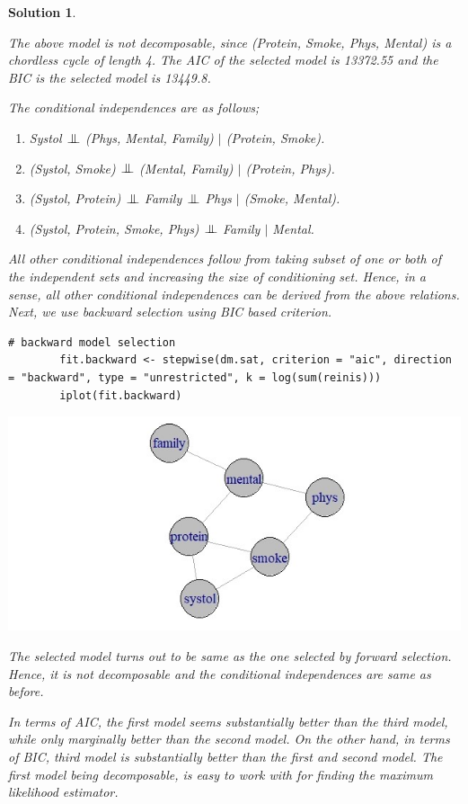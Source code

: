 \documentclass[12pt]{article}
\theoremstyle{problemstyle}
\newtheorem*{solution*}{Solution}
\newcommand{\indep}{\mathrel{\text{\scalebox{1.07}{$\perp\mkern-10mu\perp$}}}}
\begin{document}
\begin{solution*}
\begin{enumerate}
	The above model is not decomposable, since (Protein, Smoke, Phys, Mental) is a chordless cycle of length 4. The AIC of the selected model is 13372.55 and the BIC is the selected model is 13449.8.
	
	The conditional independences are as follows;
	\begin{enumerate}
		\item Systol $\indep$ (Phys, Mental, Family) $\mid$ (Protein, Smoke).
		\item (Systol, Smoke) $\indep$  (Mental, Family) $\mid$ (Protein, Phys).
		\item (Systol, Protein) $\indep$ Family $\indep$ Phys $\mid$ (Smoke, Mental).
		\item (Systol, Protein, Smoke, Phys) $\indep$ Family $\mid$ Mental.
	\end{enumerate}
	All other conditional independences follow from taking subset of one or both of the independent sets and increasing the size of conditioning set. Hence, in a sense, all other conditional independences can be derived from the above relations. Next, we use backward selection using BIC based criterion.
	
	\begin{lstlisting}[style = R-code]
		# backward model selection
		fit.backward <- stepwise(dm.sat, criterion = "aic", direction = "backward", type = "unrestricted", k = log(sum(reinis)))
		iplot(fit.backward)
	\end{lstlisting}
	
	\includegraphics[width=\linewidth]{reinis-bic-backward.jpeg}
	
	The selected model turns out to be same as the one selected by forward selection. Hence, it is not decomposable and the conditional independences are same as before.
	
	In terms of AIC, the first model seems substantially better than the third model, while only marginally better than the second model. On the other hand, in terms of BIC, third model is substantially better than the first and second model. The first model being decomposable, is easy to work with for finding the maximum likelihood estimator.
	

\end{enumerate}
\end{solution*}
\end{document}

